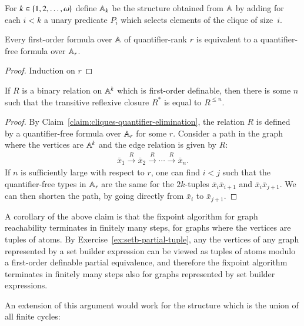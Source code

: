  


{
For $k \in \{1,2,\ldots,\omega\}$ define $\mathbb A_k$ be the structure obtained from $\mathbb A$ by adding for each $i < k$ a unary predicate $P_i$ which selects elements of the clique of size~$i$. 
\begin{claim}\label{claim:cliques-quantifier-elimination}
	Every first-order formula over $\mathbb A$ of quantifier-rank $r$ is equivalent to a quantifier-free formula over $\mathbb A_r$.
\end{claim}
\begin{proof}
	Induction on $r$ 
\end{proof}

\begin{claim}
	\label{claim:cliques-transitive-closure}
	If $R$ is a binary relation on $\mathbb A^k$ which is first-order definable, then there is some $n$ such that the transitive reflexive closure $R^*$ is equal to $R^{\le n}$. 
\end{claim}
\begin{proof} By Claim~\ref{claim:cliques-quantifier-elimination}, the relation $R$ is defined by a quantifier-free formula over $\mathbb A_r$ for some $r$.
	Consider a path in the graph where the vertices are $\mathbb A^k$ and the edge relation is given by $R$:
	\begin{align*}
		\bar x_1 \stackrel R \to \bar x_2 \stackrel R \to \cdots \stackrel R \to \bar x_n.
	\end{align*}
	 If $n$ is sufficiently large with respect to $r$, one can find $i < j$ such that the quantifier-free types in $\mathbb A_r$ are the same for the $2k$-tuples $\bar x_i \bar x_{i+1}$ and $\bar x_i \bar x_{j+1}$. We can then shorten the path, by going directly from $\bar x_i$ to $\bar x_{j+1}$. 
\end{proof}
A corollary of the above claim is that the fixpoint algorithm for graph reachability terminates in finitely many steps, for graphs where the vertices are tuples of atoms. By Exercise~\ref{ex:setb-partial-tuple}, any the vertices of any graph represented by a set builder expression can be viewed as tuples of atoms modulo a first-order definable partial equivalence, and therefore the fixpoint algorithm terminates in finitely many steps also for graphs represented by set builder expressions. 

An extension of this argument would work for the structure which is the union of all finite cycles:

}






